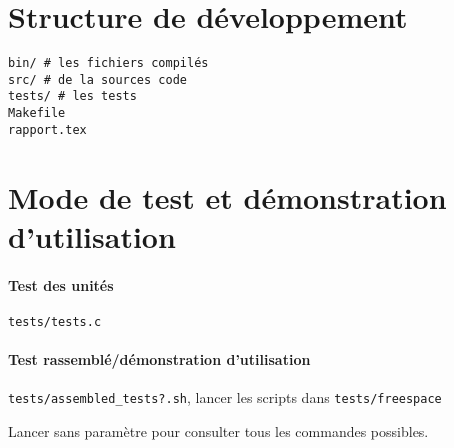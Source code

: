 \documentclass{report}
\begin{document}
\section{Structure de développement}

\begin{verbatim}
bin/ # les fichiers compilés
src/ # de la sources code
tests/ # les tests
Makefile
rapport.tex
\end{verbatim}

\section{Mode de test et démonstration d'utilisation}

\paragraph{Test des unités} \verb|tests/tests.c|
\paragraph{Test rassemblé/démonstration d'utilisation} \verb|tests/assembled_tests?.sh|, lancer
les scripts dans \verb|tests/freespace|

Lancer sans paramètre pour consulter tous les commandes possibles.
\end{document}
